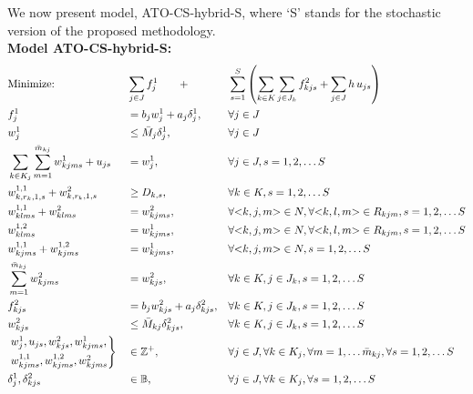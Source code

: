 \documentclass[twoside,onecolumn,12pt,letterpaper]{article}
\begin{document}
%
We now present model, ATO-CS-hybrid-S, where `S' stands for the stochastic version of the proposed methodology. \\ 
\textbf{Model ATO-CS-hybrid-S:}
\begin{alignat}{4}
& \text{Minimize: } \qquad && \sum_{j \in J} f_{j}^{1} \qquad + && \sum_{s=1}^{S} \left( \sum_{k \in K} \sum_{j \in J_k} f_{kjs}^{2} + \sum_{j\in J} h \, u_{js} \right) \label{eq:fullmodelobj_stochastic} \\
& f_{j}^{1} &&  = b_j w_{j}^{1} + a_j \delta_{j}^1, &&  \forall j \in J \label{eq:c7_stochastic} \\
& w_{j}^{1} &&  \leq \bar{M}_{j} \delta_{j}^1, &&  \forall j \in J \label{eq:c8_stochastic} \\
& \sum_{k \in K_j} \sum_{m=1}^{\bar{m}_{kj}} w_{kjms}^{1} + u_{js} &&  = w_{j}^{1} , &&  \forall j \in J, s=1,2,\ldots S \label{eq:c5_stochastic} \\
& w_{k,r_k,1,s}^{1,1} + w_{k,r_k,1,s}^{2} &&  \geq D_{k,s} , &&  \forall k \in K, s=1,2,\ldots S \label{eq:c1_stochastic} \\
& w_{klms}^{1,1} + w_{klms}^{2} &&  = w_{kjms}^{2} , &&  \forall {<}k,j,m{>} \in N, \forall {<}k,l,m{>} \in R_{kjm}, s=1,2,\ldots S \label{eq:c2_stochastic} \\
& w_{klms}^{1,2} &&  = w_{kjms}^{1} , &&  \forall {<}k,j,m{>} \in N, \forall {<}k,l,m{>} \in R_{kjm}, s=1,2,\ldots S \label{eq:c3_stochastic} \\
& w_{kjms}^{1,1} + w_{kjms}^{1,2} &&  = w_{kjms}^{1} , &&  \forall {<}k,j,m{>} \in N, s=1,2,\ldots S \label{eq:c4_stochastic} \\
& \sum_{m=1}^{\bar{m}_{kj}} w_{kjms}^{2} &&  = w_{kjs}^{2} , &&  \forall k \in K, j \in J_k, s=1,2,\ldots S \label{eq:c6_stochastic} \\
& f_{kjs}^{2} &&  = b_j w_{kjs}^{2} + a_j \delta_{kjs}^2, &&  \forall k \in K, j \in J_k, s=1,2,\ldots S \label{eq:c9_stochastic} \\
& w_{kjs}^{2} &&  \leq \bar{M}_{kj} \delta_{kjs}^{2}, &&  \forall k \in K, j \in J_k, s=1,2,\ldots S \label{eq:c10_stochastic} \\
& \begin{rcases}
w_{j}^{1},u_{js},w_{kjs}^{2},w_{kjms}^{1}, \\
w_{kjms}^{1,1},w_{kjms}^{1,2},w_{kjms}^{2} 
\end{rcases}
&& \in \mathbb{Z}^{+}, &&  \forall j \in J, \forall k \in K_j, \forall m=1,\ldots \bar{m}_{kj}, \forall s=1,2,\ldots S \label{eq:cdomain1_stochastic} \\
& \delta_{j}^1, \delta_{kjs}^2 && \in \mathbb{B}, &&  \forall j \in J, \forall k \in K_j,\forall s=1,2,\ldots S \label{eq:cdomain2_stochastic} 
\end{alignat}
\end{document}
